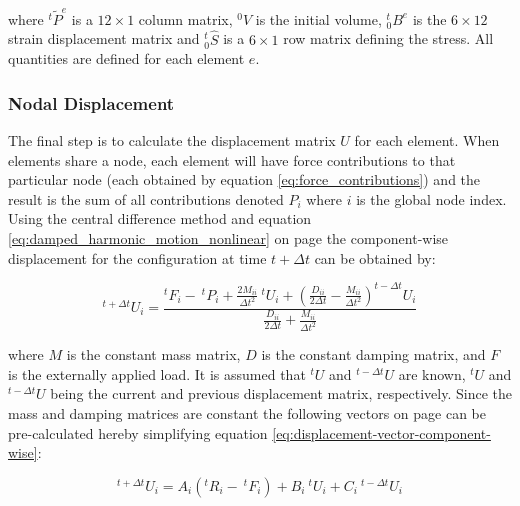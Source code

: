 where $^t\tilde{P}^{e}$ is a $12 \times 1$ column matrix, $^0V$ is
the initial volume, $^t_0B^{e}$ is the $6 \times 12$ strain
displacement matrix and $^t_0\hat{S}$ is a $6 \times 1$
row matrix defining the stress. All quantities are defined for each
element $e$.

\subsubsection*{Nodal Displacement}
\label{sec:nodal_displacement}
The final step is to calculate the displacement matrix $U$ for each
element. When elements share a node, each element will have force
contributions to that particular 
node (each obtained by equation \ref{eq:force_contributions}) and the result is
the sum of all contributions denoted $P_i$ where $i$ is the global
node index. \\

Using the central difference method and equation
\eqref{eq:damped_harmonic_motion_nonlinear} on page
\pageref{eq:damped_harmonic_motion_nonlinear} the component-wise
displacement for the configuration at time $t + \Delta t$ can be
obtained by: 

\begin{equation}
\label{eq:displacement-vector-component-wise}
^{t+\Delta t}U_i = \frac{^tF_i - \ ^tP_i + \frac{2M_{ii}}{\Delta
    t^2} \ ^tU_i + (\frac{D_{ii}}{2 \Delta t} - \frac{M_{ii}}{\Delta
    t^2})^{t-\Delta t}U_i}{\frac{D_{ii}}{2 \Delta t} +
  \frac{M_{ii}}{\Delta t^2}}
\end{equation}

where $M$ is the constant mass matrix, $D$ is the constant damping
matrix, and $F$ is the externally applied load. It is assumed that
$^tU$ and $^{t-\Delta t}U$ are known, $^tU$ and $^{t-\Delta t}U$ being
the current and previous displacement matrix, respectively.
Since the mass and
damping matrices are constant the following vectors on page
\pageref{eq:vector_component_abc} can be pre-calculated 
hereby simplifying equation \eqref{eq:displacement-vector-component-wise}:

\begin{equation}
\label{eq:displacement-vector-reduced}
^{t+\Delta t}U_i = A_i(^tR_i - \ ^tF_i) + B_i \ ^tU_i + C_i \ ^{t-\Delta t}U_i
\end{equation}


